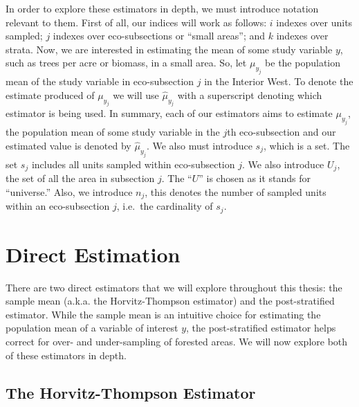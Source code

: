 \documentclass[12pt,twoside]{reedthesis}
\begin{document}
In order to explore these estimators in depth, we must introduce notation relevant to them. First of all, our indices will work as follows: \(i\) indexes over units sampled; \(j\) indexes over eco-subsections or ``small areas''; and \(k\) indexes over strata. Now, we are interested in estimating the mean of some study variable \(y\), such as trees per acre or biomass, in a small area. So, let \(\mu_{y_j}\) be the population mean of the study variable in eco-subsection \(j\) in the Interior West. To denote the estimate produced of \(\mu_{y_j}\) we will use \(\hat\mu_{y_j}\) with a superscript denoting which estimator is being used. In summary, each of our estimators aims to estimate \(\mu_{y_j}\), the population mean of some study variable in the \(j\)th eco-subsection and our estimated value is denoted by \(\hat\mu_{y_j}\). We also must introduce \(s_j\), which is a set. The set \(s_j\) includes all units sampled within eco-subsection \(j\). We also introduce \(U_j\), the set of all the area in subsection \(j\). The ``\(U\)'' is chosen as it stands for ``universe.'' Also, we introduce \(n_j\), this denotes the number of sampled units within an eco-subsection \(j\), i.e.~the cardinality of \(s_j\).

\hypertarget{direct-estimation}{%
\section{Direct Estimation}\label{direct-estimation}}

There are two direct estimators that we will explore throughout this thesis: the sample mean (a.k.a. the Horvitz-Thompson estimator) and the post-stratified estimator. While the sample mean is an intuitive choice for estimating the population mean of a variable of interest \(y\), the post-stratified estimator helps correct for over- and under-sampling of forested areas. We will now explore both of these estimators in depth.

\hypertarget{the-horvitz-thompson-estimator}{%
\subsection{The Horvitz-Thompson Estimator}\label{the-horvitz-thompson-estimator}}
\end{document}
